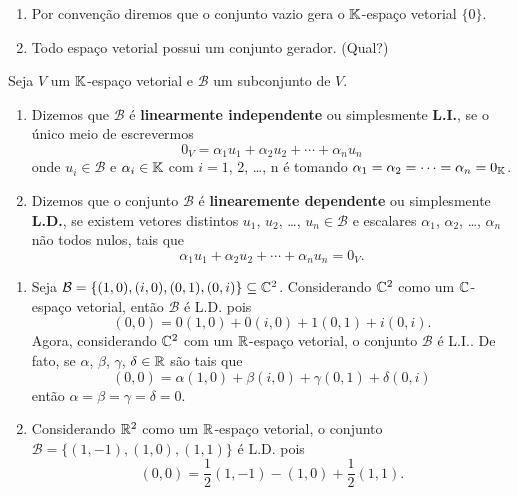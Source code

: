\begin{observacao}
	\begin{enumerate}\label{conjuntogerador}
		\item Por conven\c{c}\~ao diremos que o conjunto vazio gera o $\mathbb{K}$-espa\c{c}o vetorial $\{0\}$.\label{geradorconjuntonulo}
		\item Todo espa\c{c}o vetorial possui um conjunto gerador. (Qual?)
	\end{enumerate}
\end{observacao}

\begin{definicao}
	Seja $V$ um $\mathbb{K}$-espa\c{c}o vetorial e $\mathcal{B}$ um subconjunto de $V$.
	\begin{enumerate}[label={\roman*})]
		\item Dizemos que $\mathcal{B}$ \'e \textbf{linearmente independente} ou simplesmente \textbf{L.I.}, se o \'unico meio de escrevermos
		\[
			0_V = \alpha_1 u_1 + \alpha_2 u_2 + \cdots + \alpha_n u_n
		\]
		onde $u_i \in \mathcal{B}$ e $\alpha_i \in \mathbb{K}$ com $i = 1$, 2, \dots, n \'e tomando $\alpha_1 = \alpha_2 = \cdots = \alpha_n = 0_{\mathbb{K}}$.

		\item Dizemos que o conjunto $\mathcal{B}$ \'e \textbf{linearemente dependente} ou simplesmente
		\textbf{L.D.}, se existem vetores distintos $u_1$, $u_2$, \dots, $u_n \in \mathcal{B}$ e escalares $\alpha_1$, $\alpha_2$, \dots, $\alpha_n$ n\~ao todos nulos, tais que
		\[
			\alpha_1 u_1 + \alpha_2 u_2 + \cdots + \alpha_n u_n = 0_V.
		\]
	\end{enumerate}
\end{definicao}

\begin{exemplo}
	\begin{enumerate}[label={\arabic*})]
		\item Seja $\mathcal{B} = \{(1, 0), (i, 0), (0, 1), (0, i)\}\subseteq \mathbb{C}^2$. Considerando $\mathbb{C}^2$ como um $\mathbb{C}$-espa\c{c}o vetorial, ent\~ao $\mathcal{B}$ \'e L.D. pois
		\[
			(0, 0) = 0(1, 0) + 0(i, 0) + 1(0, 1) + i(0, i).
		\]
		Agora, considerando $\mathbb{C}^2$ com um $\mathbb{R}$-espa\c{c}o vetorial, o conjunto $\mathcal{B}$ \'e L.I.. De fato, se $\alpha$, $\beta$, $\gamma$, $\delta \in \mathbb{R}$ s\~ao tais que
		\[
			(0, 0 ) = \alpha(1, 0) + \beta(i, 0) + \gamma(0, 1) + \delta(0, i)
		\]
		ent\~ao $\alpha = \beta = \gamma = \delta = 0$.
		\item Considerando $\mathbb{R}^2$ como um $\mathbb{R}$-espa\c{c}o vetorial, o conjunto $\mathcal{B} = \{(1, -1), (1, 0), (1, 1)\}$ \'e L.D. pois
		\[
			(0, 0 ) = \dfrac{1}{2}(1, -1) - (1, 0) + \dfrac{1}{2}(1, 1).
		\]
	\end{enumerate}
\end{exemplo}

